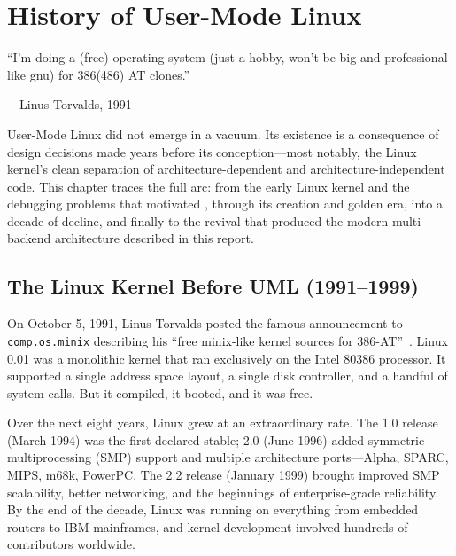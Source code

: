 
\chapter{History of User-Mode Linux}
\label{ch:history}

\epigraph{``I'm doing a (free) operating system (just a hobby, won't be big and
professional like gnu) for 386(486) AT clones.''}{---Linus Torvalds, 1991~\cite{torvalds1991}}

\noindent
User-Mode Linux did not emerge in a vacuum.  Its existence is a consequence of
design decisions made years before its conception---most notably, the Linux
kernel's clean separation of architecture-dependent and architecture-independent
code.  This chapter traces the full arc: from the early Linux kernel and the
debugging problems that motivated \UML{}, through its creation and golden era, into
a decade of decline, and finally to the revival that produced the modern
multi-backend architecture described in this report.

\section{The Linux Kernel Before UML (1991--1999)}
\label{sec:history-prelude}

On October 5, 1991, Linus Torvalds posted the famous announcement to
\texttt{comp.os.minix} describing his ``free minix-like kernel sources for
386-AT''~\cite{torvalds1991}.  Linux 0.01 was a monolithic kernel that ran
exclusively on the Intel 80386 processor.  It supported a single address space
layout, a single disk controller, and a handful of system calls.  But it
compiled, it booted, and it was free.

Over the next eight years, Linux grew at an extraordinary rate.  The 1.0 release
(March 1994) was the first declared stable; 2.0 (June 1996) added symmetric
multiprocessing (SMP) support and multiple architecture ports---Alpha, SPARC,
MIPS, m68k, PowerPC.  The 2.2 release (January 1999) brought improved SMP
scalability, better networking, and the beginnings of enterprise-grade
reliability.  By the end of the decade, Linux was running on everything from
embedded routers to IBM mainframes, and kernel development involved hundreds of
contributors worldwide.

